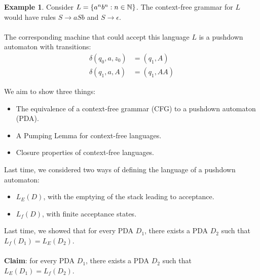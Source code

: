 \documentclass[]{article}
\DeclarePairedDelimiter{\set}{\lbrace}{\rbrace}
\theoremstyle{definition}
\newtheorem{ex}{Example}[section]
\newcommand{\lecture}[1]{\marginpar{{\footnotesize $\leftarrow$ \underline{#1}}}}
\begin{document}
        \begin{ex} \lecture{October 24, 2013}
          Consider $L = \set{a^n b^n : n \in \mathbb{N}}$. The context-free grammar for $L$ would have rules $S \to aSb$ and $S \to \epsilon$.
          \\ \\
          The corresponding machine that could accept this language $L$ is a pushdown automaton with transitions:
          \begin{align*}
            \delta(q_0, a, z_0) &= (q_1, A) \\
            \delta(q_1, a, A) &= (q_1, AA)
          \end{align*}
        \end{ex}

        We aim to show three things:
        \begin{itemize}
          \item The equivalence of a context-free grammar (CFG) to a pushdown automaton (PDA).
          \item A Pumping Lemma for context-free languages.
          \item Closure properties of context-free languages.
        \end{itemize}

        Last time, we considered two ways of defining the language of a pushdown automaton:
        \begin{itemize}
          \item $L_E(D)$, with the emptying of the stack leading to acceptance.
          \item $L_f(D)$, with finite acceptance states.
        \end{itemize}

        Last time, we showed that for every PDA $D_1$, there exists a PDA $D_2$ such that $L_f(D_1) = L_E(D_2)$.
        \\ \\
        \textbf{Claim}: for every PDA $D_1$, there exists a PDA $D_2$ such that $L_E(D_1) = L_f(D_2)$.
\end{document}

